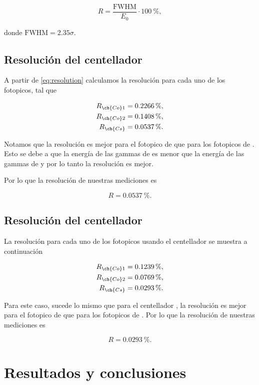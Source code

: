 \documentclass[12pt]{article}
\begin{document}
    \begin{equation}
        R = \dfrac{\text{FWHM}}{E_{0}} \cdot \qty{100}{\percent},
        \label{eq:resolution}
    \end{equation}

    donde \(\text{FWHM} = 2.35\sigma\).
    
    \subsection*{Resolución del centellador }

    A partir de \cref{eq:resolution} calculamos la resolución para cada uno de los fotopicos, tal que

    \begin{align*}
        R_{\ch{Co}1} &= \qty{0.2266}{\percent}, \\
        R_{\ch{Co}2} &= \qty{0.1408}{\percent}, \\
        R_{\ch{Cs}} &= \qty{0.0537}{\percent}.
    \end{align*}

    Notamos que la resolución es mejor para el fotopico de  que para los fotopicos de . Esto se debe a que la energía de las gammas de  es menor que la energía de las gammas de  y por lo tanto la resolución es mejor.

    Por lo que la resolución de nuestras mediciones es

    \begin{equation*}
        R = \qty{0.0537}{\percent}.
    \end{equation*}

    \subsection*{Resolución del centellador }

    La resolución para cada uno de los fotopicos usando el centellador  se muestra a continuación

    \begin{align*}
        R_{\ch{Co}1} &= \qty{0.1239}{\percent}, \\
        R_{\ch{Co}2} &= \qty{0.0769}{\percent}, \\
        R_{\ch{Cs}} &= \qty{0.0293}{\percent}.
    \end{align*}

    Para este caso, sucede lo mismo que para el centellador , la resolución es mejor para el fotopico de  que para los fotopicos de . Por lo que la resolución de nuestras mediciones es

    \begin{equation*}
        R = \qty{0.0293}{\percent}.
    \end{equation*}

    \section*{Resultados y conclusiones}
    \kant[1]
    
    \newpage
    \printbibliography
\end{document}
